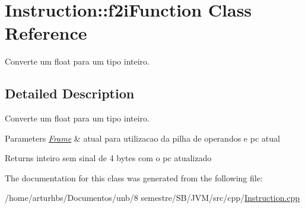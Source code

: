 \hypertarget{classInstruction_1_1f2iFunction}{}\section{Instruction\+:\+:f2i\+Function Class Reference}
\label{classInstruction_1_1f2iFunction}


Converte um float para um tipo inteiro.  




\subsection{Detailed Description}
Converte um float para um tipo inteiro. 


\begin{DoxyParams}{Parameters}
{\em \hyperlink{classFrame}{Frame}} & atual para utilizacao da pilha de operandos e pc atual \\
\hline
\end{DoxyParams}
\begin{DoxyReturn}{Returns}
inteiro sem sinal de 4 bytes com o pc atualizado 
\end{DoxyReturn}


The documentation for this class was generated from the following file\+:\begin{DoxyCompactItemize}
\item 
/home/arturhbs/\+Documentos/unb/8 semestre/\+S\+B/\+J\+V\+M/src/cpp/\hyperlink{Instruction_8cpp}{Instruction.\+cpp}\end{DoxyCompactItemize}

